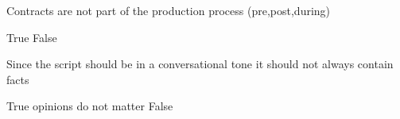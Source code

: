 \documentclass[theme=sleek, randomorder, hidesidemenu]{webquiz}
\begin{document}
\begin{question}
  Contracts are not part of the production process (pre,post,during)
  \begin{choice}
    \incorrect True
    \correct False
  \end{choice}
\end{question}

\begin{question}
  Since the script should be in a conversational tone it should not always contain facts
  \begin{choice}
    \incorrect True \feedback opinions do not matter
    \correct False
  \end{choice}

\end{question}
\end{document}
